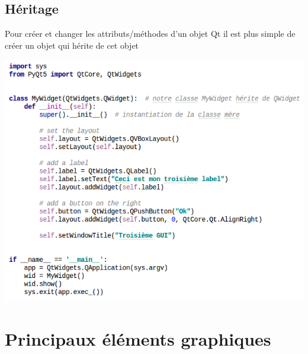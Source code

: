 \documentclass[9pt, french, brown]{beamer}
\begin{document}
\subsection{Héritage}
\begin{frame}[fragile]{\secname}{\subsecname}
Pour créer et changer les attributs/méthodes d'un objet Qt il est plus simple de créer un objet qui hérite de cet objet
\begin{center}\includegraphics[height=0.7\textheight]{img/widget2_1}\end{center}
\end{frame}


\section{Principaux éléments graphiques}

\end{document}
